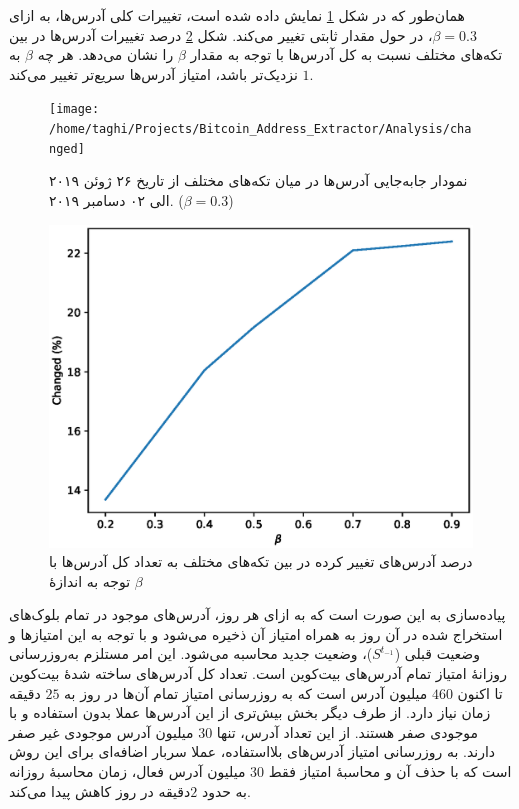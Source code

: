 همان‌طور که در شکل \ref{fig:changed} نمایش داده شده است، تغییرات کلی آدرس‌ها، به ازای $\beta=0.3$، در حول مقدار ثابتی تغییر می‌کند. شکل \ref{fig:betachange} درصد تغییرات آدرس‌ها در بین تکه‌های مختلف نسبت به کل آدرس‌ها با توجه به مقدار $\beta$ را نشان می‌دهد. هر چه $\beta$ به $1$ نزدیک‌تر باشد، امتیاز آدرس‌ها سریع‌تر تغییر می‌کند.

\begin{figure}[h]
	\centering
	\texttt{[image: /home/taghi/Projects/Bitcoin\_Address\_Extractor/Analysis/changed]}
	\caption{%
		نمودار جابه‌جایی آدرس‌ها در میان تکه‌های مختلف از تاریخ ۲۶ ژوئن ۲۰۱۹ الی ۰۲ دسامبر ۲۰۱۹. ($\beta=0.3$)
	}
	\label{fig:changed}
\end{figure}


\begin{figure}[h!]
	\centering
	\includegraphics[width=0.7\linewidth]{image/beta_change}
	\caption{درصد آدرس‌های تغییر کرده در بین تکه‌های مختلف به تعداد کل آدرس‌ها با توجه به اندازهٔ $\beta$}
	\label{fig:betachange}
\end{figure}



پیاده‌سازی به این صورت است که به ازای هر روز، آدرس‌های موجود در تمام بلوک‌های استخراج شده در آن روز به همراه امتیاز آن ذخیره می‌شود و با توجه به این امتیاز‌ها و وضعیت قبلی ($S^{t_{-1}}$)، وضعیت جدید محاسبه می‌شود. این امر مستلزم به‌‌روزرسانی روزانهٔ امتیاز تمام آدرس‌های بیت‌کوین است. تعداد کل آدرس‌های ساخته شدهٔ بیت‌کوین تا اکنون $460$ میلیون آدرس است که به روزرسانی امتیاز تمام آن‌ها در روز به $25$ دقیقه زمان نیاز دارد. از طرف دیگر بخش بیش‌تری از این آدرس‌ها عملا بدون استفاده و با موجودی صفر هستند. از این تعداد آدرس، تنها $30$ میلیون آدرس موجودی غیر صفر دارند. به روزرسانی امتیاز آدرس‌های بلااستفاده، عملا سربار اضافه‌ای برای این روش است که با حذف آن و محاسبهٔ امتیاز فقط $30$ میلیون آدرس فعال، زمان محاسبهٔ روزانه به حدود $2$دقیقه در روز کاهش پیدا می‌کند. 

